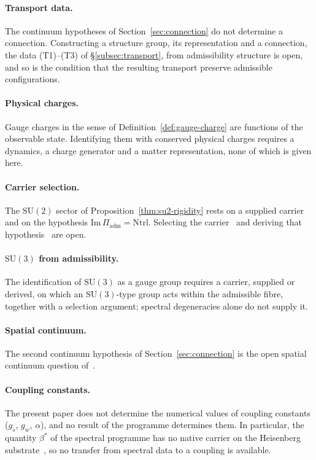 \documentclass[11pt,a4paper]{article}
\begin{document}
  \paragraph{Transport data.}
    The continuum hypotheses of Section~\ref{sec:connection} do not determine a connection.
    Constructing a structure group, its representation and a connection, the data (T1)--(T3) of
    §\ref{subsec:transport}, from admissibility structure is open, and so is the condition that the
    resulting transport preserve admissible configurations.

  \paragraph{Physical charges.}
    Gauge charges in the sense of Definition~\ref{def:gauge-charge} are functions of the observable
    state.
    Identifying them with conserved physical charges requires a dynamics, a charge generator and a
    matter representation, none of which is given here.

  \paragraph{Carrier selection.}
    The $\mathrm{SU}(2)$ sector of Proposition~\ref{thm:su2-rigidity} rests on a supplied carrier
    and on the hypothesis $\mathrm{Im}\,\Pi_{\mathrm{adm}} = \mathrm{Ntrl}$.
    Selecting the carrier~\cite{Beau2026a27} and deriving that hypothesis~\cite{Beau2026a31} are
    open.

  \paragraph{$\mathrm{SU}(3)$ from admissibility.}
    The identification of $\mathrm{SU}(3)$ as a gauge group requires a carrier, supplied or
    derived, on which an $\mathrm{SU}(3)$-type group acts within the admissible fibre, together
    with a selection argument; spectral degeneracies alone do not supply it.

  \paragraph{Spatial continuum.}
    The second continuum hypothesis of Section~\ref{sec:connection} is the open spatial
    continuum question of~\cite{Beau2026q5a}.

  \paragraph{Coupling constants.}
    The present paper does not determine the numerical values of coupling constants
    ($g_s$, $g_w$, $\alpha$), and no result of the programme determines them.
    In particular, the quantity $\beta^*$ of the spectral programme has no native carrier on the
    Heisenberg substrate~\cite{Beau2026a31}, so no transfer from spectral data to a coupling is
    available.
\end{document}
